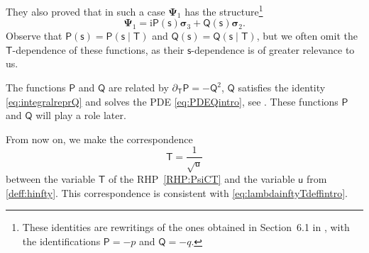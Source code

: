 \documentclass[reqno,a4paper,11pt]{amsart}
\newcommand{\ii}{\mathrm{i}}
\renewcommand{\bm}{\mathbf}
\newcommand{\msf}{\mathsf}
\renewcommand{\sp}{\boldsymbol \sigma}
\newcommand{\sad}{\msf s}
\newcommand{\uad}{\msf u}
\theoremstyle{definition}
\theoremstyle{remark}
\numberwithin{equation}{section}
\begin{document}
     They also proved that in such a case $\bm \Psi_1$ has the structure\footnote{These identities are rewritings of the ones obtained in Section~6.1 in \cite{ClaeysTarricone24}, with the identifications $ \msf P=- p$ and $\msf Q=- q$.}
    \begin{equation}\label{eq:Psi1_decomposition}
        \bm \Psi_1 = \ii \msf P(\sad) \sp_3 + \msf Q(\sad) \sp_2.
        \end{equation}
    Observe that $\msf P(\sad)=\msf P(\sad\mid \msf T)$ and $\msf Q(\sad)=\msf Q(\sad\mid \msf T)$, but we often omit the $\msf T$-dependence of these functions, as their $\sad$-dependence is of greater relevance to us.
    
    The functions $\msf P$ and $\msf Q$ are related by $\msf \partial_{\msf T}\msf P=-\msf Q^2$, $\msf Q$ satisfies the identity \eqref{eq:integralreprQ} and solves the PDE \eqref{eq:PDEQintro}, see \cite[$\mathsection$ 6.1]{ClaeysTarricone24}. These functions $\msf P$ and $\msf Q$ will play a role later.

From now on, we make the correspondence
%
$$
\msf T= \frac{1}{\sqrt{\uad}}
$$
%
between the variable $\msf T$ of the RHP~\ref{RHP:PsiCT} and the variable $\msf u$ from \eqref{deff:hinfty}. This correspondence is consistent with \eqref{eq:lambdainftyTdeffintro}.
\end{document}
